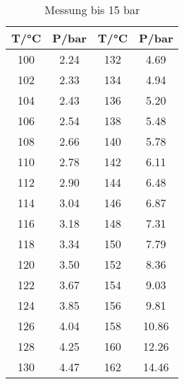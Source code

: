 \begin{table}
  \centering
  \caption{Messung bis 15 bar}
  \label{tab:data2}
\begin{tabular}{c c c c}
  \toprule
  T/°C &   P/bar  &   T/°C &   P/bar \\
  \midrule
  100  &   2.24   &   132  &   4.69  \\
  102  &   2.33   &   134  &   4.94  \\
  104  &   2.43   &   136  &   5.20  \\
  106  &   2.54   &   138  &   5.48  \\
  108  &   2.66   &   140  &   5.78  \\
  110  &   2.78   &   142  &   6.11  \\
  112  &   2.90   &   144  &   6.48  \\
  114  &   3.04   &   146  &   6.87  \\
  116  &   3.18   &   148  &   7.31  \\
  118  &   3.34   &   150  &   7.79  \\
  120  &   3.50   &   152  &   8.36  \\
  122  &   3.67   &   154  &   9.03  \\
  124  &   3.85   &   156  &   9.81  \\
  126  &   4.04   &   158  &  10.86  \\
  128  &   4.25   &   160  &  12.26  \\
  130  &   4.47   &   162  &  14.46  \\
  \bottomrule
  \end{tabular}
\end{table}
